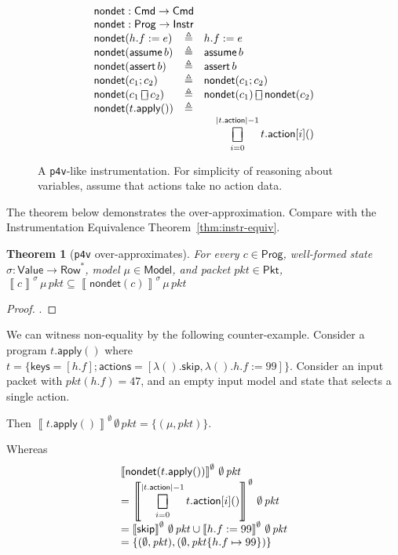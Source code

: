 \documentclass{article}
\newcommand{\pkt}{\mathit{pkt}}
\newcommand{\denote}[1]{\left\llbracket#1\right\rrbracket}
\newcommand{\Value}{\mathsf{Value}}
\newcommand{\Cmd}{\mathsf{Cmd}}
\newcommand{\Instr}{\mathsf{Instr}}
\newcommand{\Prog}{\mathsf{Prog}}
\newcommand{\Pkt}{\mathsf{Pkt}}
\newcommand{\Model}{\mathsf{Model}}
\newcommand{\Row}{\mathsf{Row}}
\newcommand{\action}{\mathsf{action}}
\newcommand{\actions}{\mathsf{actions}}
\newcommand{\keys}{\mathsf{keys}}
\newcommand{\assert}{\mathop{\mathsf{assert}}}
\newcommand{\assume}{\mathop{\mathsf{assume}}}
\newcommand{\apply}{\mathsf{apply}}
\newcommand{\choiceop}{\rotatebox[origin=c]{90}{$\sqsubset\!\!\!\sqsupset$}}
\newcommand{\choice}{\mathbin{\choiceop}}
\DeclareMathOperator*{\bigchoice}{\scalerel*{\choiceop}{\sum}}
\newcommand{\SKIP}{\mathsf{skip}}
\newcommand{\nondet}{\mathsf{nondet}}
\newtheorem{theorem}{Theorem}
\begin{document}
\begin{figure}
  \[\begin{array}{l >{\triangleq}cl}
  \multicolumn{3}{l}{\nondet : \Cmd \to \Cmd} \\
  \multicolumn{3}{l}{\nondet : \Prog \to \Instr} \\
  \nondet(h.f := e) && h.f := e \\
  \nondet(\assume b) && \assume b \\
  \nondet(\assert b) && \assert b \\
  \nondet(c_1;c_2) && \nondet(c_1;c_2) \\
  \nondet(c_1 \choice c_2) && \nondet(c_1) \choice \nondet(c_2) \\
  \nondet(t.\apply()) && \\
  \multicolumn{3}{>{\qquad}r}{
    \displaystyle
    \bigchoice_{i = 0}^{|t.\action|-1}t.\action[i]()
  }
  \end{array}\]
  \caption{A \texttt{p4v}-like instrumentation. For simplicity of reasoning
    about variables, assume that actions take no action data. }
  \label{fig:p4vlike}
\end{figure}

The theorem below demonstrates the over-approximation. Compare with the Instrumentation Equivalence Theorem~\ref{thm:instr-equiv}.

\begin{theorem}[\texttt{p4v} over-approximates]
  \label{thm:p4v-over}
  For every $c \in \Prog$, well-formed state $\sigma : \Value \to \Row^* $,
  model $\mu \in \Model$, and packet $\pkt \in \Pkt$,
  $\denote{c}^\sigma\,\mu\,\pkt \subseteq \denote{\nondet(c)}^\sigma\,\mu\,\pkt$
\end{theorem}

\begin{proof}
.
\end{proof}

We can witness non-equality by the following counter-example. Consider a program
$t.\apply()$ where $t = \{\keys=[h.f];\actions=[\lambda().\SKIP, \lambda(). h.f :=
  99]\}$. Consider an input packet with $\pkt(h.f) = 47$, and an empty input
model and state that selects a single action.

Then $\denote{t.\apply()}^\emptyset\,\emptyset\,\pkt = \{(\mu,\pkt)\}$.

Whereas
\[\begin{array}{l}
\denote{\nondet(t.\apply())}^\emptyset\,\emptyset\,\pkt \\
= \denote{
    \displaystyle
    \bigchoice_{i = 0}^{|t.\action|-1} t.\action[i]()
}^\emptyset\,\emptyset\,\pkt \\
= \denote{\SKIP}^\emptyset\,\emptyset\,\pkt \cup \denote{h.f := 99}^\emptyset\,\emptyset\,\pkt\\
= \{(\emptyset,\pkt),(\emptyset,\pkt\{h.f\mapsto 99\})\}
\end{array}\]
\end{document}

